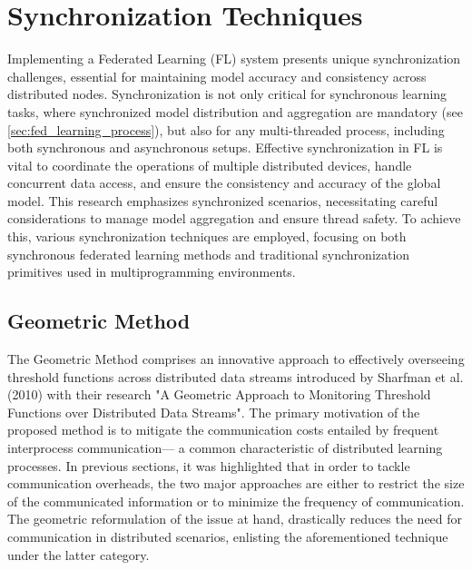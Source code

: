 \section{Synchronization Techniques}
\label{sec:synch_techniques}

Implementing a Federated Learning (FL) system presents unique synchronization challenges, essential for maintaining model accuracy and
consistency across distributed nodes. Synchronization is not only critical for synchronous learning tasks, where synchronized model distribution
and aggregation are mandatory (see \cref{sec:fed_learning_process}), but also for any multi-threaded process, including both synchronous and
asynchronous setups. Effective synchronization in FL is vital to coordinate the operations of multiple distributed devices, handle concurrent
data access, and ensure the consistency and accuracy of the global model. This research emphasizes synchronized scenarios, necessitating careful
considerations to manage model aggregation and ensure thread safety. To achieve this, various synchronization techniques are employed, focusing
on both synchronous federated learning methods and traditional synchronization primitives used in multiprogramming environments.

\subsection{Geometric Method}\label{sec:geometric_method}
The Geometric Method comprises an innovative approach to effectively overseeing threshold functions across distributed data streams
introduced by Sharfman et al. (2010)\cite{sharfmanGeometricApproachMonitoring2010} with their research "A Geometric Approach to
Monitoring Threshold Functions over Distributed Data Streams". The primary motivation of the proposed method is to mitigate the
communication costs entailed by frequent interprocess communication— a common characteristic of distributed learning processes.
In previous sections, it was highlighted that in order to tackle communication overheads, the two major approaches are either to
restrict the size of the communicated information or to minimize the frequency of communication. The geometric reformulation of
the issue at hand, drastically reduces the need for communication in distributed scenarios, enlisting the aforementioned technique
under the latter category.


